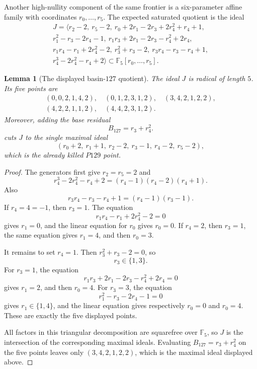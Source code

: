 \documentclass[11pt]{amsart}
\newtheorem{lemma}[theorem]{Lemma}
\newcommand{\F}{\mathbb F}
\begin{document}
Another high-nullity component of the same frontier is a six-parameter affine
family with coordinates \(r_0,\ldots,r_5\).  The expected saturated quotient is
the ideal
\[
\begin{gathered}
J=\langle
r_2-2,\ r_5-2,\ 
r_0+2r_1-2r_3+2r_4^2+r_4+1,\\
r_1^2-r_3-2r_4-1,\ 
r_1r_3+2r_1-2r_3-r_4^2+2r_4,\\
r_1r_4-r_1+2r_4^2-2,\ 
r_3^2+r_3-2,\ 
r_3r_4-r_3-r_4+1,\\
r_4^3-2r_4^2-r_4+2
\rangle
\subset \F_5[r_0,\ldots,r_5].
\end{gathered}
\]
\begin{lemma}[The displayed basin-\(127\) quotient]
\label{lem:J127-points}
The ideal \(J\) is radical of length \(5\).  Its five points are
\[
\begin{gathered}
(0,0,2,1,4,2),\quad
(0,1,2,3,1,2),\quad
(3,4,2,1,2,2),\\
(4,2,2,1,1,2),\quad
(4,4,2,3,1,2).
\end{gathered}
\]
Moreover, adding the base residual
\[
  B_{127}=r_3+r_4^2.
\]
cuts \(J\) to the single maximal ideal
\[
  (r_0+2,\ r_1+1,\ r_2-2,\ r_3-1,\ r_4-2,\ r_5-2),
\]
which is the already killed \(P129\) point.
\end{lemma}

\begin{proof}
The generators first give \(r_2=r_5=2\) and
\[
  r_4^3-2r_4^2-r_4+2=(r_4-1)(r_4-2)(r_4+1).
\]
Also
\[
  r_3r_4-r_3-r_4+1=(r_4-1)(r_3-1).
\]
If \(r_4=4=-1\), then \(r_3=1\).  The equation
\[
  r_1r_4-r_1+2r_4^2-2=0
\]
gives \(r_1=0\), and the linear equation for \(r_0\) gives \(r_0=0\).  If
\(r_4=2\), then \(r_3=1\), the same equation gives \(r_1=4\), and then
\(r_0=3\).

It remains to set \(r_4=1\).  Then \(r_3^2+r_3-2=0\), so
\[
  r_3\in\{1,3\}.
\]
For \(r_3=1\), the equation
\[
  r_1r_3+2r_1-2r_3-r_4^2+2r_4=0
\]
gives \(r_1=2\), and then \(r_0=4\).  For \(r_3=3\), the equation
\[
  r_1^2-r_3-2r_4-1=0
\]
gives \(r_1\in\{1,4\}\), and the linear equation gives respectively
\(r_0=0\) and \(r_0=4\).  These are exactly the five displayed points.

All factors in this triangular decomposition are squarefree over \(\F_5\), so
\(J\) is the intersection of the corresponding maximal ideals.  Evaluating
\(B_{127}=r_3+r_4^2\) on the five points leaves only
\((3,4,2,1,2,2)\), which is the maximal ideal displayed above.
\end{proof}
\end{document}
